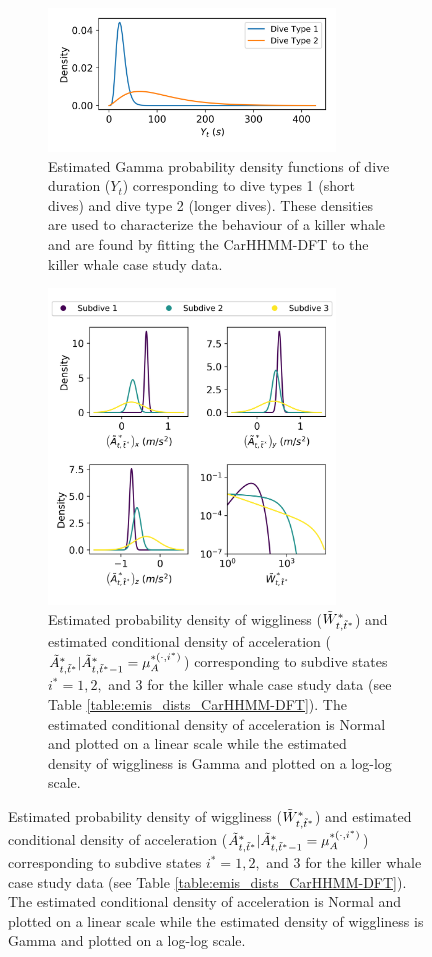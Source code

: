 \begin{figure}[ht]
\begin{subfigure}{\textwidth}
	\centering
	\includegraphics[width=3in]{../Plots/CarHHMM2-coarse-emissions.png}
	\caption{Estimated Gamma probability density functions of dive duration ($Y_t$) corresponding to dive types 1 (short dives) and dive type 2 (longer dives). These  densities are used to characterize the behaviour of a killer whale and are found by fitting the CarHHMM-DFT to the killer whale case study data.}
	\label{fig:coarse_emis}
\end{subfigure}
\newline
\begin{subfigure}{\textwidth}
	\centering
	\includegraphics[width=3in]{../Plots/CarHHMM2-fine-emissions.png}
	\caption{Estimated probability density of wiggliness ($\tilde{W}^*_{t,\tilde t^*}$) and estimated conditional density of acceleration ($\tilde{A}^*_{t,\tilde t^*}|\tilde{A}^*_{t,\tilde t^*-1} = \mu_A^{*(\cdot,i^*)}$) corresponding to subdive states $i^* = 1,2,$ and $3$ for the killer whale case study data (see Table \ref{table:emis_dists_CarHHMM-DFT}). The estimated conditional density of acceleration is Normal and plotted on a linear scale while the estimated density of wiggliness is Gamma and plotted on a log-log scale.}
	\label{fig:fine_emis}
\end{subfigure}
\end{figure}

